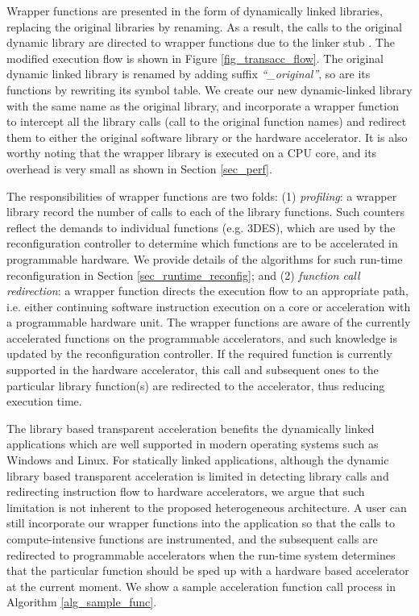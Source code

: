 Wrapper functions are presented in the form of dynamically linked
libraries, replacing the original libraries by renaming. As a result,
the calls to the original dynamic library are directed to wrapper
functions due to the linker stub \cite{linkerstub}. The modified
execution flow is shown in Figure \ref{fig_transacc_flow}.  The
original dynamic linked library is renamed by adding suffix
{\em ``\_original''}, so are its functions by rewriting its symbol table. We
create our new dynamic-linked library with the same name as the original library, and
incorporate a wrapper function to intercept all the library calls
(call to the original function names) and
redirect them to either the original software library or the hardware
accelerator. It is also worthy noting that the wrapper library is
executed on a CPU core, and its overhead is very small as shown in
Section \ref{sec_perf}.

The responsibilities of wrapper functions are two folds: (1) {\em profiling}:
a wrapper library record the number of calls to each of the
library functions. Such counters reflect the demands to individual
functions (e.g. 3DES), which are used by the reconfiguration
controller to determine which functions are to be accelerated in
programmable hardware. We provide details of the algorithms for such
run-time reconfiguration in Section \ref{sec_runtime_reconfig}; and (2)
{\em function call redirection}: a wrapper function directs the
execution flow to an appropriate path, i.e. either continuing software instruction execution on a core or
acceleration with a programmable hardware unit. The wrapper functions
are aware of the currently accelerated functions on the programmable
accelerators, and such knowledge is updated by the reconfiguration
controller. If the required function is currently supported in the hardware
accelerator, this call and subsequent ones to the particular library
function(s) are redirected to the accelerator, thus reducing execution
time.

The library based transparent acceleration benefits the dynamically
linked applications which are well supported in modern operating
systems such as Windows and Linux. For statically linked applications,
although the dynamic library based transparent acceleration is limited
in detecting library calls and redirecting instruction flow to
hardware accelerators, we argue that such limitation is not inherent
to the proposed heterogeneous architecture. A user can still
incorporate our wrapper functions into the application so that the
calls to compute-intensive functions are instrumented, and the
subsequent calls are redirected to programmable accelerators when the
run-time system determines that the particular function should be sped
up with a hardware based accelerator at the current moment.
We show a sample acceleration function call process in Algorithm \ref{alg_sample_func}.

